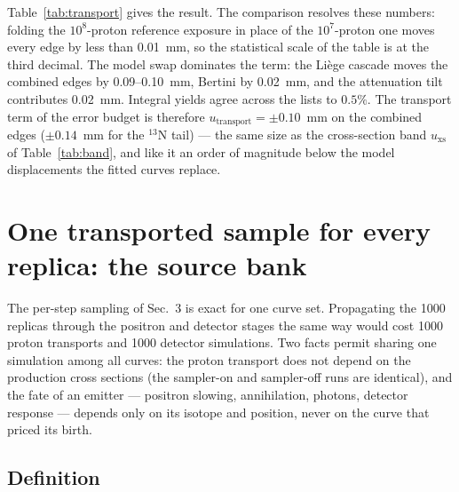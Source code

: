 \documentclass[11pt]{article}
\newcommand{\generateddir}{docs/generated/sampling_xsections}
\newcommand{\generateddir}{generated/sampling_xsections}
\newcommand{\file}[1]{\texttt{#1}}
\begin{document}
\begin{table}[htbp]
\centering
\caption{The transport term: edge displacements of the nominal folded
profiles when the final-state model is swapped
($\Delta_{\mathrm{BERT}}$, $\Delta_{\mathrm{INCL}}$) and when the
nonelastic attenuation is varied by $\pm3\%$ ($\Delta_{\Sigma\pm3\%}$).
$u_{\mathrm{transport}}$ is the largest of the three.  Generated by
\file{analysis\_transport/xsections/transport\_envelope.py}.}
\label{tab:transport}

\end{table}

Table~\ref{tab:transport} gives the result.  The comparison resolves these
numbers: folding the $10^{8}$-proton reference exposure in place of the
$10^{7}$-proton one moves every edge by less than \SI{0.01}{mm}, so the
statistical scale of the table is at the third decimal.  The model swap
dominates the term: the Li\`ege cascade moves the combined edges by
\SI{0.09}{}--\SI{0.10}{mm}, Bertini by \SI{0.02}{mm}, and the attenuation
tilt contributes \SI{0.02}{mm}.  Integral yields agree across the lists to
$0.5\%$.  The transport term of the error budget is therefore
$u_{\mathrm{transport}} = \pm0.10$~mm on the combined edges
($\pm0.14$~mm for the $^{13}$N tail) --- the same size as the
cross-section band $u_{\mathrm{xs}}$ of Table~\ref{tab:band}, and like it
an order of magnitude below the model displacements the fitted curves
replace.

\section{One transported sample for every replica: the source bank}
\label{sec:bank}

The per-step sampling of Sec.~3 is exact for one curve set.  Propagating
the 1000 replicas through the positron and detector stages the same way
would cost 1000 proton transports and 1000 detector simulations.  Two facts
permit sharing one simulation among all curves: the proton transport does
not depend on the production cross sections (the sampler-on and sampler-off
runs are identical), and the fate of an emitter --- positron slowing,
annihilation, photons, detector response --- depends only on its isotope
and position, never on the curve that priced its birth.

\subsection{Definition}
\end{document}
